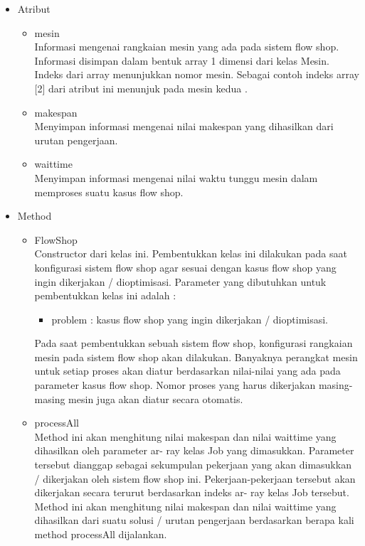 \begin{itemize}
		\begin{itemize}
			\item Atribut
			\begin{itemize}
				\item mesin \\
				Informasi mengenai rangkaian mesin yang ada pada sistem flow shop. Informasi
				disimpan dalam bentuk array 1 dimensi dari kelas Mesin. Indeks dari array menunjukkan 
				nomor mesin. Sebagai contoh indeks array [2] dari atribut
				ini menunjuk pada mesin kedua .
				\item makespan \\
				Menyimpan informasi mengenai nilai makespan yang dihasilkan dari urutan pengerjaan.
				\item waittime \\
				Menyimpan informasi mengenai nilai waktu tunggu mesin dalam memproses suatu kasus flow shop.
			\end{itemize}
			\item Method 
			\begin{itemize}
				\item FlowShop \\
				Constructor dari kelas ini. Pembentukkan kelas ini dilakukan pada saat konfigurasi
				sistem flow shop agar sesuai dengan kasus flow shop yang ingin dikerjakan
				/ dioptimisasi. Parameter yang dibutuhkan untuk pembentukkan kelas ini
				adalah :
				\begin{itemize}
					\item problem : kasus flow shop yang ingin dikerjakan / dioptimisasi.
				\end{itemize}
				Pada saat pembentukkan sebuah sistem flow shop, konfigurasi rangkaian mesin
				pada sistem flow shop akan dilakukan. Banyaknya perangkat mesin untuk
				setiap proses akan diatur berdasarkan nilai-nilai yang ada pada parameter kasus
				flow shop. Nomor proses yang harus dikerjakan masing-masing mesin juga
				akan diatur secara otomatis.
				\item processAll \\
				Method ini akan menghitung nilai makespan dan nilai waittime yang dihasilkan oleh parameter ar-
				ray kelas Job yang dimasukkan. Parameter tersebut dianggap sebagai sekumpulan
				pekerjaan yang akan dimasukkan / dikerjakan oleh sistem flow shop ini.
				Pekerjaan-pekerjaan tersebut akan dikerjakan secara terurut berdasarkan indeks ar-
				ray kelas Job tersebut. Method ini akan menghitung nilai makespan dan nilai waittime yang dihasilkan
				dari suatu solusi / urutan pengerjaan berdasarkan berapa kali method processAll dijalankan.
				

\end{itemize}
\end{itemize}
\end{itemize}
